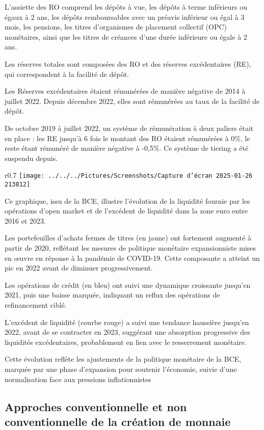 \documentclass[a4paper, 12pt]{report}
\begin{document}
L'assiette des RO comprend les dépôts à vue, les dépôts à terme inférieurs ou égaux à 2 ans, les dépôts remboursables avec un préavis inférieur ou égal à 3 mois, les pensions, les titres d'organismes de placement collectif (OPC) monétaires, ainsi que les titres de créances d'une durée inférieure ou égale à 2 ans.

Les réserves totales sont composées des RO et des réserves excédentaires (RE), qui correspondent à la facilité de dépôt.

Les Réserves excédentaires étaient rémunérées de manière négative de 2014 à juillet 2022. Depuis décembre 2022, elles sont rémunérées au taux de la facilité de dépôt.

De octobre 2019 à juillet 2022, un système de rémunération à deux paliers était en place : les RE jusqu'à 6 fois le montant des RO étaient rémunérées à 0\%, le reste étant rémunéré de manière négative à -0,5\%. Ce système de tiering a été suspendu depuis.

\begin{wrapfigure}{r}{0.7\textwidth}
	\centering
\texttt{[image: ../../../Pictures/Screenshots/Capture d'écran 2025-01-26 213812]}
\end{wrapfigure}
Ce graphique, issu de la BCE, illustre l'évolution de la liquidité fournie par les opérations d'open market et de l'excédent de liquidité dans la zone euro entre 2016 et 2023.  

Les portefeuilles d'achats fermes de titres (en jaune) ont fortement augmenté à partir de 2020, reflétant les mesures de politique monétaire expansionniste mises en œuvre en réponse à la pandémie de COVID-19. Cette composante a atteint un pic en 2022 avant de diminuer progressivement.  

Les opérations de crédit (en bleu) ont suivi une dynamique croissante jusqu'en 2021, puis une baisse marquée, indiquant un reflux des opérations de refinancement ciblé.  

L'excédent de liquidité (courbe rouge) a suivi une tendance haussière jusqu'en 2022, avant de se contracter en 2023, suggérant une absorption progressive des liquidités excédentaires, probablement en lien avec le resserrement monétaire.  

Cette évolution reflète les ajustements de la politique monétaire de la BCE, marquée par une phase d'expansion pour soutenir l'économie, suivie d'une normalisation face aux pressions inflationnistes

\subsection{Approches conventionnelle et non conventionnelle de la création de monnaie}
	
\end{document}
